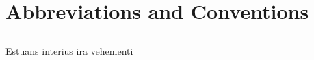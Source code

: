 \chapter*{Abbreviations and Conventions}
\label{chapter:conventions}
\section*{}
\singlespacing

Estuans interius ira vehementi